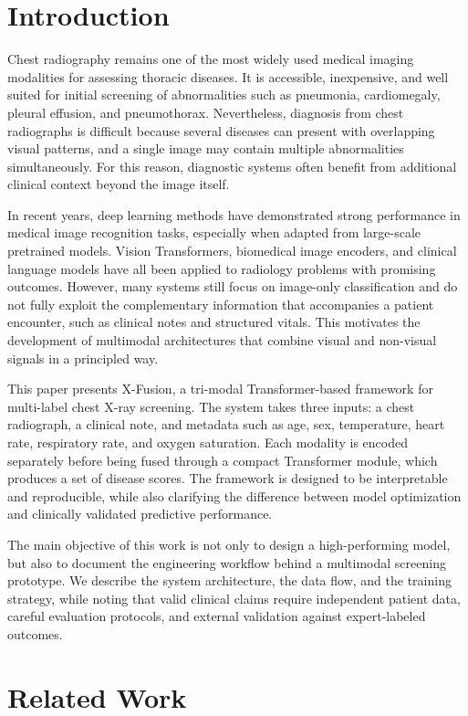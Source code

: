 \documentclass[conference,a4paper]{IEEEtran}
\begin{document}
\section{Introduction}

Chest radiography remains one of the most widely used medical imaging modalities for assessing thoracic diseases. It is accessible, inexpensive, and well suited for initial screening of abnormalities such as pneumonia, cardiomegaly, pleural effusion, and pneumothorax. Nevertheless, diagnosis from chest radiographs is difficult because several diseases can present with overlapping visual patterns, and a single image may contain multiple abnormalities simultaneously. For this reason, diagnostic systems often benefit from additional clinical context beyond the image itself.

In recent years, deep learning methods have demonstrated strong performance in medical image recognition tasks, especially when adapted from large-scale pretrained models. Vision Transformers, biomedical image encoders, and clinical language models have all been applied to radiology problems with promising outcomes. However, many systems still focus on image-only classification and do not fully exploit the complementary information that accompanies a patient encounter, such as clinical notes and structured vitals. This motivates the development of multimodal architectures that combine visual and non-visual signals in a principled way.

This paper presents X-Fusion, a tri-modal Transformer-based framework for multi-label chest X-ray screening. The system takes three inputs: a chest radiograph, a clinical note, and metadata such as age, sex, temperature, heart rate, respiratory rate, and oxygen saturation. Each modality is encoded separately before being fused through a compact Transformer module, which produces a set of disease scores. The framework is designed to be interpretable and reproducible, while also clarifying the difference between model optimization and clinically validated predictive performance.

The main objective of this work is not only to design a high-performing model, but also to document the engineering workflow behind a multimodal screening prototype. We describe the system architecture, the data flow, and the training strategy, while noting that valid clinical claims require independent patient data, careful evaluation protocols, and external validation against expert-labeled outcomes.

\section{Related Work}
\end{document}

